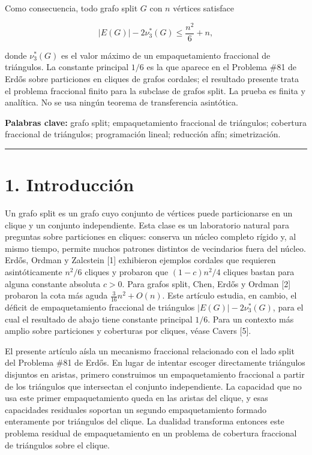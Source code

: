 \documentclass[
  11pt,
]{article}
\begin{document}
Como consecuencia, todo grafo split \(G\) con \(n\) vértices satisface

\[
\boxed{
|E(G)|-2\nu_3^*(G)\le \frac{n^2}{6}+n,
}
\]

donde \(\nu_3^*(G)\) es el valor máximo de un empaquetamiento fraccional
de triángulos. La constante principal \(1/6\) es la que aparece en el
Problema \#81 de Erdős sobre particiones en cliques de grafos cordales;
el resultado presente trata el problema fraccional finito para la
subclase de grafos split. La prueba es finita y analítica. No se usa
ningún teorema de transferencia asintótica.

\textbf{Palabras clave:} grafo split; empaquetamiento fraccional de
triángulos; cobertura fraccional de triángulos; programación lineal;
reducción afín; simetrización.

\begin{center}\rule{0.5\linewidth}{0.5pt}\end{center}

\section{1. Introducción}\label{introducciuxf3n}

Un grafo split es un grafo cuyo conjunto de vértices puede particionarse
en un clique y un conjunto independiente. Esta clase es un laboratorio
natural para preguntas sobre particiones en cliques: conserva un núcleo
completo rígido y, al mismo tiempo, permite muchos patrones distintos de
vecindarios fuera del núcleo. Erdős, Ordman y Zalcstein {[}1{]}
exhibieron ejemplos cordales que requieren asintóticamente \(n^2/6\)
cliques y probaron que \((1-c)n^2/4\) cliques bastan para alguna
constante absoluta \(c>0\). Para grafos split, Chen, Erdős y Ordman
{[}2{]} probaron la cota más aguda \(\frac{3}{16}n^2+O(n)\). Este
artículo estudia, en cambio, el déficit de empaquetamiento fraccional de
triángulos \(|E(G)|-2\nu_3^*(G)\), para el cual el resultado de abajo
tiene constante principal \(1/6\). Para un contexto más amplio sobre
particiones y coberturas por cliques, véase Cavers {[}5{]}.

El presente artículo aísla un mecanismo fraccional relacionado con el
lado split del Problema \#81 de Erdős. En lugar de intentar escoger
directamente triángulos disjuntos en aristas, primero construimos un
empaquetamiento fraccional a partir de los triángulos que intersectan el
conjunto independiente. La capacidad que no usa este primer
empaquetamiento queda en las aristas del clique, y esas capacidades
residuales soportan un segundo empaquetamiento formado enteramente por
triángulos del clique. La dualidad transforma entonces este problema
residual de empaquetamiento en un problema de cobertura fraccional de
triángulos sobre el clique.
\end{document}

